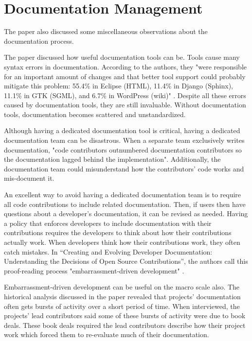 \documentclass[titlepage]{article}
\begin{document}
\section{Documentation Management}

The paper also discussed some miscellaneous observations about the documentation process. 

The paper discussed how useful documentation tools can be. Tools cause many syntax errors in documentation. According to the authors, they "were responsible for an important amount of changes and that better tool support could probably mitigate this problem: 55.4\% in Eclipse (HTML), 11.4\% in Django (Sphinx), 11.1\% in GTK (SGML), and 6.7\% in WordPress (wiki)" \cite[p.4]{Dagenais:2010:CED:1882291.1882312}. Despite all these errors caused by documentation tools, they are still invaluable. Without documentation tools, documentation becomes scattered and unstandardized.

Although having a dedicated documentation tool is critical, having a dedicated documentation team can be disastrous. When a separate team exclusively writes documentation, "code contributors outnumbered documentation contributors so the documentation lagged behind the implementation"\cite[p.7]{Dagenais:2010:CED:1882291.1882312}. Additionally, the documentation team could misunderstand how the contributors' code works and mis-document it.


An excellent way to avoid having a dedicated documentation team is to require all code contributions to include related documentation. Then, if users then have questions about a developer's documentation, it can be revised as needed. Having a policy that enforces developers to include documentation with their contributions requires the developers to think about how their contributions actually work. When developers think how their contributions work, they often catch mistakes. In “Creating and Evolving Developer Documentation: Understanding the Decisions of Open Source Contributions”, the authors call this proof-reading process "embarrassment-driven development" \cite[p.6]{Dagenais:2010:CED:1882291.1882312}.

Embarrassment-driven development can be useful on the macro scale also. The historical analysis discussed in the paper revealed that projects' documentation often gets bursts of activity over a short period of time. When interviewed, the projects' lead contributors said some of these bursts of activity were due to book deals. These book deals required the lead contributors describe how their project work which forced them to re-evaluate much of their documentation.
\end{document}
